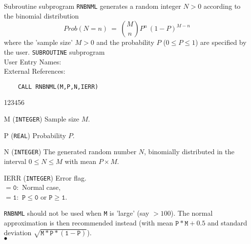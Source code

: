                              
                
\Submitter{}                               
Subroutine subprogram
{\tt RNBNML} generates a random integer $N>0$ according to the
binomial distribution
$$ Prob(N=n) \ = \ \binom{M}{n} P^n\,(1-P)^{M-n} $$
where the 'sample size' $M>0$ and the probability
$P$ ($0 \le P \le 1$) are specified by the user.
\Structure
{\tt SUBROUTINE} subprogram \\
User Entry Names: \\
External References: 
\Usage
\begin{verbatim}
    CALL RNBNML(M,P,N,IERR)
\end{verbatim}
\begin{DLtt}{123456}
\item [M] ({\tt INTEGER}) Sample size $M$.
\item [P] ({\tt REAL}) Probability $P$.
\item [N]({\tt INTEGER}) The generated random number $N$, binomially
distributed in the interval $0 \le N \le M$ with mean
$P \times M$.
\item [IERR]({\tt INTEGER}) Error flag. \\
$\mathtt{= 0:}$ Normal case, \\
$\mathtt{= 1:}$ $\mathtt{P \le 0}$ or $\mathtt{P \ge 1}$.
\end{DLtt}
\Notes
{\tt RNBNML} should not be used when {\tt M} is 'large' (say
$ >100 $). The normal approximation is then recommended instead (with
mean $\mathtt{P*M+0.5}$ and standard deviation
$\sqrt{\mathtt{M*P*(1-P)}}$).
\\ $\bullet$
